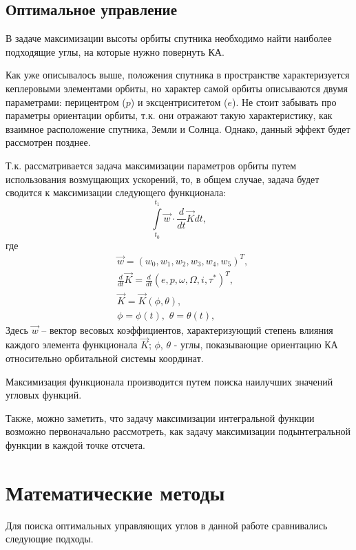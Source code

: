 \subsection{Оптимальное управление}
\noindent\indent В задаче максимизации высоты орбиты спутника необходимо найти
наиболее подходящие углы, на которые нужно повернуть КА.\par
  Как уже описывалось выше, положения спутника в пространстве характеризуется
кеплеровыми элементами орбиты, но характер самой орбиты описываются двумя параметрами:
перицентром ($p$) и эксцентриситетом ($e$). Не стоит забывать про параметры ориентации
орбиты, т.к. они отражают такую характеристику, как взаимное расположение спутника,
Земли и Солнца. Однако, данный эффект будет рассмотрен позднее.\par
  Т.к. рассматривается задача максимизации параметров орбиты путем использования
возмущающих ускорений, то, в общем случае, задача будет сводится к максимизации
следующего функционала:
\begin{equation} \label{eq:IntMaxFullEq}
  \int\limits_{t_0}^{t_1} \vec{w} \cdot \frac{d}{dt}\vec{K} dt,
\end{equation}
где
\begin{equation}
  \begin{aligned}
    & \vec{w} = (w_0, w_1, w_2, w_3, w_4, w_5)^T, \\
    & \frac{d}{dt}\vec{K} = \frac{d}{dt}(e, p, \omega, \Omega, i, \tau^*)^T, \\
    & \vec{K} = \vec{K}(\phi, \theta), \\
    & \phi = \phi(t),\,\, \theta = \theta(t),
  \end{aligned}
\end{equation}
Здесь $\vec{w}$ -- вектор весовых коэффициентов, характеризующий степень влияния
каждого элемента функционала $\vec{K}$; $\phi$, $\theta$ - углы, показывающие ориентацию
КА относительно орбитальной системы координат.\par
    Максимизация функционала производится путем поиска наилучших значений угловых
функций.\par
    Также, можно заметить, что задачу максимизации интегральной функции возможно первоначально
рассмотреть, как задачу максимизации подынтегральной функции в каждой точке отсчета.
\section{Математические методы}
\noindent\indent Для поиска оптимальных управляющих углов в данной работе сравнивались
следующие подходы.
